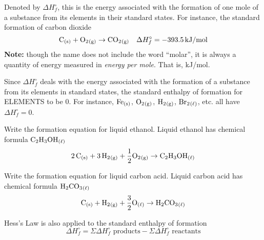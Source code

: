 Denoted by $\Delta H^{\circ}_f$, this is the energy associated with the formation of one mole of a 
substance from its elements in their standard states. For instance, the standard formation of 
carbon dioxide
\[
    \ch{C_{(s)}}+\ch{O2_{(g)}}\to \ch{CO2_{(g)}}\quad\Delta H^{\circ}_f=-393.5\,\si{kJ/mol}
\]
\textbf{Note:} though the name does not include the word ``molar'', it is always a quantity of
energy measured in \textit{energy per mole}. That is, kJ/mol.
\begin{important}
    Since $\Delta H^{\circ}_f$ deals with the energy associated with the formation of a substance
    from its elements in standard states, the standard enthalpy of formation for ELEMENTS to be 0.
    For instance, $\ch{Fe_{(s)}}$, $\ch{O2_{(g)}}$, $\ch{H2_{(g)}}$, $\ch{Br2_{(\ell)}}$, etc.
    all have $\Delta H^{\circ}_f=0$.
\end{important}

\begin{sample}{Write the formation equation for liquid ethanol.}
    Liquid ethanol has chemical formula $\ch{C2H3OH_{(\ell)}}$
    \[
        \ch{2C_{(s)}}+\ch{3H2_{(g)}}+\frac{1}{2}\ch{O2_{(g)}}\to \ch{C2H3OH_{(\ell)}}
    \]
\end{sample}

\begin{sample}{Write the formation equation for liquid carbon acid.}
    Liquid carbon acid has chemical formula $\ch{H2CO3_{(\ell)}}$
    \[
        \ch{C_{(s)}}+\ch{H2_{(g)}}+\frac{3}{2}\ch{O_{(\ell)}}\to \ch{H2CO3_{(\ell)}}
    \]
\end{sample}

Hess's Law is also applied to the standard enthalpy of formation
\[
    \Delta H^{\circ}_f=\Sigma\Delta H^{\circ}_f\text{ products}-\Sigma\Delta H^{\circ}_f\text{ reactants}
\]

